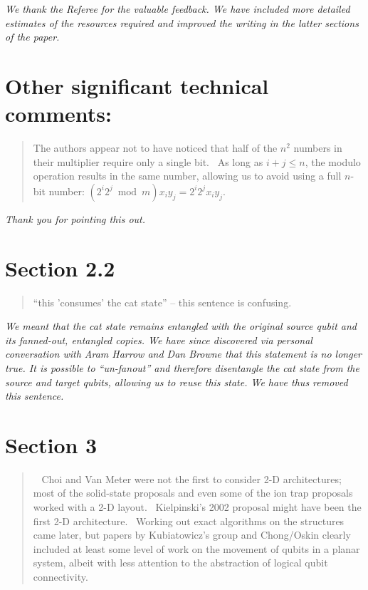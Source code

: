 \documentclass{article}
\theoremstyle{plain} \newtheorem{lemma}{Lemma}
\begin{document}
{\it We thank the Referee for the valuable feedback. 
We have included more detailed estimates of the resources required and improved
the writing in the latter sections of the paper.}

\section{Other significant technical comments:}

\begin{quote}
The authors appear not to have noticed that half of the $n^2$ numbers in
their multiplier require only a single bit.  As long as $i+j \le n$, the
modulo operation results in the same number, allowing us to avoid
using a full $n$-bit number: $(2^i 2^j \bmod m) x_i y_j = 2^i 2^j x_i y_j$.
\end{quote}

{\it Thank you for pointing this out.}

\section{Section 2.2}

\begin{quote}
``this 'consumes' the cat state'' -- this sentence is confusing.
\end{quote}

{\it We meant that the cat state remains entangled with the original source
qubit and its fanned-out, entangled copies. We have since discovered
via personal conversation with Aram Harrow and Dan Browne that this
statement is no longer true. It is possible to ``un-fanout'' and therefore
disentangle the cat state from the source and target qubits, allowing us
to reuse this state.  We have thus removed this sentence.}

\section{Section 3}

\begin{quote}
  Choi and Van Meter were not the first to consider 2-D architectures;
most of the solid-state proposals and even some of the ion trap
proposals worked with a 2-D layout.  Kielpinski's 2002 proposal might
have been the first 2-D architecture.  Working out exact algorithms on
the structures came later, but papers by Kubiatowicz's group and
Chong/Oskin clearly included at least some level of work on the
movement of qubits in a planar system, albeit with less attention to
the abstraction of logical qubit connectivity.
\end{quote}
\end{document}
